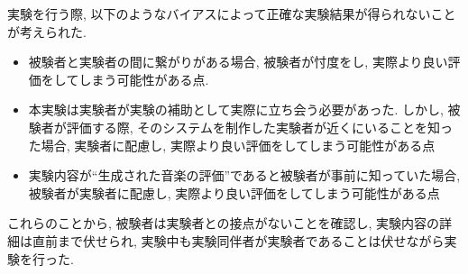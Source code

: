 \documentclass[a4paper,11pt,dvipdfmx]{jreport}
\begin{document}
実験を行う際, 以下のようなバイアスによって正確な実験結果が得られないことが考えられた.
\begin{itemize}
  \item 被験者と実験者の間に繋がりがある場合, 被験者が忖度をし, 実際より良い評価をしてしまう可能性がある点.
  \item 本実験は実験者が実験の補助として実際に立ち会う必要があった. 
        しかし, 被験者が評価する際, そのシステムを制作した実験者が近くにいることを知った場合, 
        実験者に配慮し, 実際より良い評価をしてしまう可能性がある点
  \item 実験内容が``生成された音楽の評価''であると被験者が事前に知っていた場合,
        被験者が実験者に配慮し, 実際より良い評価をしてしまう可能性がある点
\end{itemize}
これらのことから, 被験者は実験者との接点がないことを確認し, 実験内容の詳細は直前まで伏せられ, 
実験中も実験同伴者が実験者であることは伏せながら実験を行った.
\end{document}
